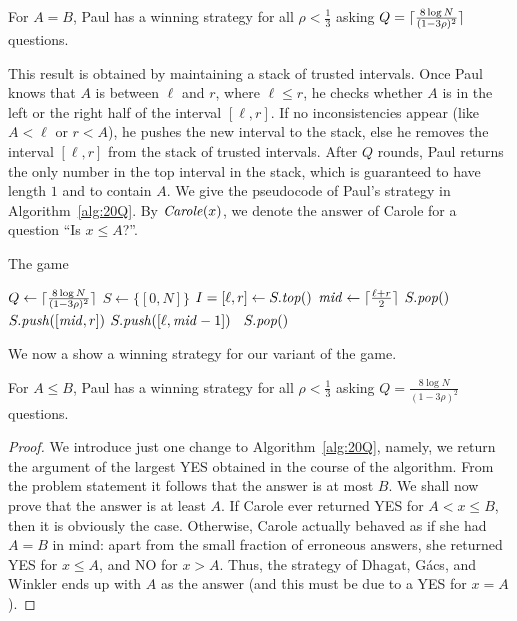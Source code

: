 \begin{theorem}
For $A = B$, Paul has a winning strategy for all $\rho < \frac{1}{3}$ asking $Q = \lceil \frac{8 \log N}{(1-3\rho)^2} \rceil$ questions.
\end{theorem}

This result is obtained by maintaining a stack of trusted intervals. Once Paul knows that $A$ is between $\ell$ and $r$, where $\ell \leq r$, he checks whether $A$ is in the left or the right half of the interval $[\ell,r]$. If no inconsistencies appear (like $A < \ell$ or $r < A$), he pushes the new interval to the stack, else he removes the interval $[\ell,r]$ from the stack of trusted intervals. After $Q$ rounds, Paul returns the only number in the top interval in the stack, which is guaranteed to have length $1$ and to contain $A$. We give the pseudocode of Paul's strategy in Algorithm~\ref{alg:20Q}. By $\mathit{Carole}(x)$, we denote the answer of Carole for a question ``Is $x \le A$?''.

\begin{algorithm}
\caption{The \twentyquestions game}
\begin{algorithmic}[1]
\State $Q \gets  \lceil \frac{8 \log N}{(1-3\rho)^2} \rceil$
\State $S \gets \{[0,N]\}$
	\State $I = [\ell,r] \gets S.\mathit{top}()$
	\State $\mathit{mid} \gets \lceil \frac{\ell + r}{2} \rceil$
	         $S.\mathit{pop}()$ 
	    \Else~$S.\mathit{push}([\mathit{mid}, r])$
        \EndIf
    \Else
        \If {$\Carole(\ell)$}
	         $S.\mathit{push}([\ell,\mathit{mid}-1])$
	    \Else~$S.\mathit{pop}()$ 
        \EndIf
	\EndIf
\EndFor
\end{algorithmic}
\label{alg:20Q}
\end{algorithm}

We now a show a winning strategy for our variant of the game. 

\begin{corollary}
\label{cor:twentyquestions}
For $A \le B$, Paul has a winning strategy for all $\rho < \frac{1}{3}$ asking $Q = { \frac{8 \log N}{(1-3\rho)^2} }$ questions.
\end{corollary}
\begin{proof}
We introduce just one change to Algorithm~\ref{alg:20Q}, namely, we return the argument of the largest YES obtained in the course of the algorithm. From the problem statement it follows that the answer is at most $B$. We shall now prove that the answer is at least $A$. If Carole ever returned YES for $A < x \le B$, then it is obviously the case. Otherwise, Carole actually behaved as if she had $A=B$ in mind: apart from the small fraction of erroneous answers, she returned YES for $x \le A$, and NO for $x > A$. Thus, the strategy of Dhagat, G{\'a}cs, and Winkler ends up with $A$ as the answer (and this must be due to a YES for $x = A$).
\end{proof}
